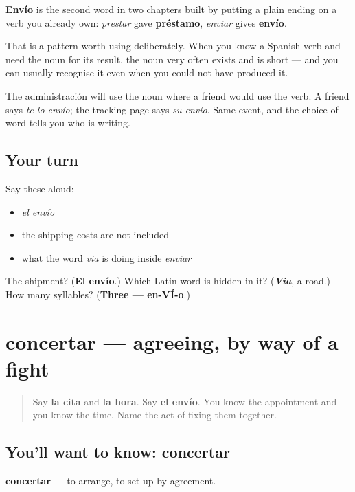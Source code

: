 \begin{culture}
\textbf{Envío} is the second word in two chapters built by putting a plain ending on a verb you already own: \emph{prestar} gave \textbf{préstamo}, \emph{enviar} gives \textbf{envío}.

That is a pattern worth using deliberately. When you know a Spanish verb and need the noun for its result, the noun very often exists and is short — and you can usually recognise it even when you could not have produced it.

The administración will use the noun where a friend would use the verb. A friend says \emph{te lo envío}; the tracking page says \emph{su envío}. Same event, and the choice of word tells you who is writing.
\end{culture}

\subsection*{Your turn}
Say these aloud:

\begin{itemize}
\raggedright
  \item \emph{el envío}
  \item the shipping costs are not included
  \item what the word \emph{via} is doing inside \emph{enviar}
\end{itemize}

\begin{tcolorbox}[breakable,colback=teal!4,colframe=teal!35!black,title={Before you move on}]
The shipment? (\textbf{El envío}.) Which Latin word is hidden in it? (\emph{\textbf{Via}}, a road.) How many syllables? (\textbf{Three — en-VÍ-o}.)
\end{tcolorbox}
\section[concertar]{concertar — agreeing, by way of a fight}

\label{lesson:ES-C442-concertar}



\begin{quote}
Say \textbf{la cita} and \textbf{la hora}. Say \textbf{el envío}. You know the appointment and you know the time. Name the act of fixing them together.
\end{quote}

\subsection*{You'll want to know: concertar}
\textbf{concertar} — to arrange, to set up by agreement.

